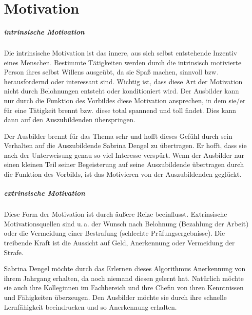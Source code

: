 \chapter{Motivation}

\paragraph{intrinsische Motivation}
Die intrinsische Motivation ist das innere, aus sich selbst entstehende Inzentiv eines Menschen. Bestimmte Tätigkeiten werden durch die intrinsisch motivierte Person ihres selbst Willens ausgeübt, da sie Spaß machen, sinnvoll bzw. herausfordernd oder interessant sind. Wichtig ist, dass diese Art der Motivation nicht durch Belohnungen entsteht oder konditioniert wird. Der Ausbilder kann nur durch die Funktion des Vorbildes diese Motivation ansprechen, in dem sie/er für eine Tätigkeit brennt bzw. diese total spannend und toll findet. Dies kann dann auf den Auszubildenden überspringen. 
\par
Der Ausbilder brennt für das Thema sehr und hofft dieses Gefühl durch sein Verhalten auf die Auszubildende Sabrina Dengel zu übertragen. Er hofft, dass sie nach der Unterweisung genau so viel Interesse verspürt. Wenn der Ausbilder nur einen kleinen Teil seiner Begeisterung auf seine Auszubildende übertragen durch die Funktion des Vorbilds, ist das Motivieren von der Auszubildenden geglückt. 

\paragraph{extrinsische Motivation}
Diese Form der Motivation ist durch äußere Reize beeinflusst. Extrinsische Motivationsquellen sind u.\,a. der Wunsch nach Belohnung (Bezahlung der Arbeit) oder die Vermeidung einer Bestrafung (schlechte Prüfungsergebnisse). Die treibende Kraft ist die Aussicht auf Geld, Anerkennung oder Vermeidung der Strafe.
\par
Sabrina Dengel möchte durch das Erlernen dieses Algorithmus Anerkennung von ihrem Jahrgang erhalten, da noch niemand diesen gelernt hat. Natürlich möchte sie auch ihre Kolleginnen im Fachbereich und ihre Chefin von ihren Kenntnissen und Fähigkeiten überzeugen. Den Ausbilder möchte sie durch ihre schnelle Lernfähigkeit beeindrucken und so Anerkennung erhalten.